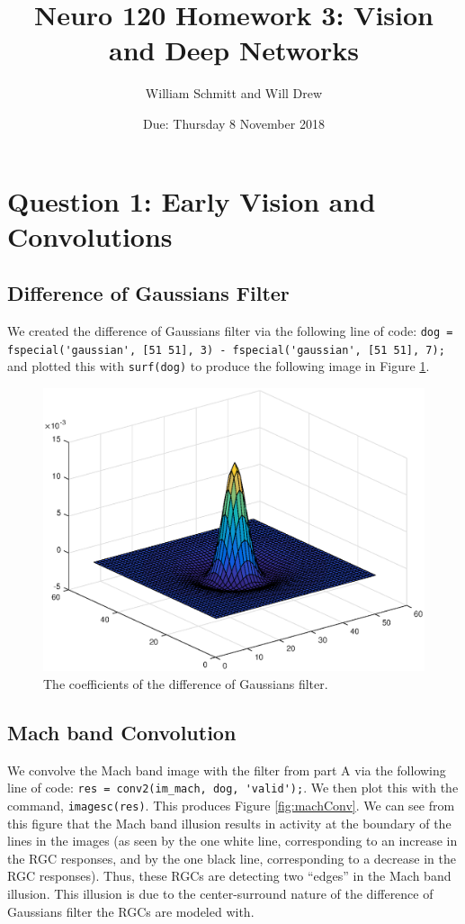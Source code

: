 \documentclass[11pt, oneside]{article}
\title{Neuro 120 Homework 3: Vision and Deep Networks}
\author{William Schmitt and Will Drew}
\date{Due: Thursday 8 November 2018}
\begin{document}
\maketitle

\section{Question 1: Early Vision and Convolutions}

\subsection{Difference of Gaussians Filter}

We created the difference of Gaussians filter via the following line of code: \lstinline{dog = fspecial('gaussian', [51 51], 3) - fspecial('gaussian', [51 51], 7);} and plotted this with \lstinline{surf(dog)} to produce the following image in Figure \ref{fig:dog}.

\begin{figure}[ht!]
\includegraphics[width=1\textwidth]{dog.eps}
\caption{The coefficients of the difference of Gaussians filter.}
\label{fig:dog}
\end{figure}

\subsection{Mach band Convolution}

We convolve the Mach band image with the filter from part A via the following line of code: \lstinline{res = conv2(im_mach, dog, 'valid');}. We then plot this with the command, \lstinline{imagesc(res)}. This produces Figure \ref{fig:machConv}. We can see from this figure that the Mach band illusion results in activity at the boundary of the lines in the images (as seen by the one white line, corresponding to an increase in the RGC responses, and by the one black line, corresponding to a decrease in the RGC responses). Thus, these RGCs are detecting two ``edges'' in the Mach band illusion. This illusion is due to the center-surround nature of the difference of Gaussians filter the RGCs are modeled with.
\end{document}
